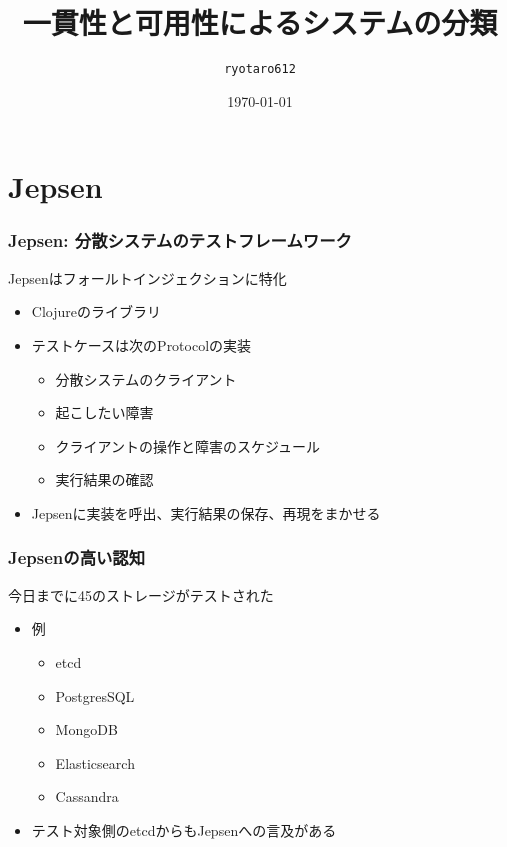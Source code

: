 \documentclass[unicode, 14pt, aspectratio=169]{beamer}
\date{\today}
\title{一貫性と可用性によるシステムの分類}
\author{\texttt{ryotaro612}}
\begin{document}
\begin{frame}
\titlepage
\end{frame}
\section{Jepsen}
\begin{frame}
  \frametitle{Jepsen: 分散システムのテストフレームワーク\cite{jepsen}}
  {\large Jepsenはフォールトインジェクションに特化}
  \begin{itemize}
  \item Clojureのライブラリ
  \item テストケースは次のProtocolの実装
    \begin{itemize}
    \item 分散システムのクライアント
    \item 起こしたい障害
    \item クライアントの操作と障害のスケジュール
    \item 実行結果の確認
    \end{itemize}
  \item Jepsenに実装を呼出、実行結果の保存、再現をまかせる
  \end{itemize}
\end{frame}
\begin{frame}
  \frametitle{Jepsenの高い認知}
  {\large 今日までに45のストレージがテストされた\cite{jepsen-analysis}}
  \begin{itemize}
  \item 例
    \begin{itemize}
    \item etcd
    \item PostgresSQL
    \item MongoDB
    \item Elasticsearch
    \item Cassandra
    \end{itemize}
  \item テスト対象側のetcdからもJepsenへの言及がある\cite{jepsen-etcd}
  \end{itemize}
\end{frame}
\end{document}
